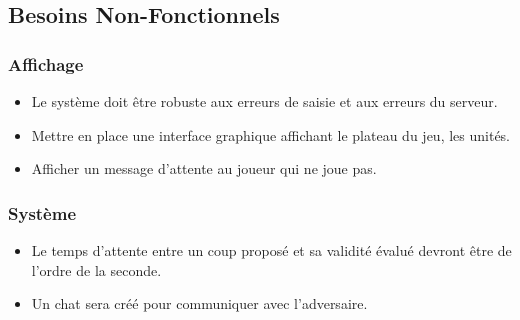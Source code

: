 \subsection{Besoins Non-Fonctionnels}

\subsubsection{Affichage}
\begin{itemize}
    \item Le système doit être robuste aux erreurs de saisie et aux erreurs du serveur.
    \item Mettre en place une interface graphique affichant le plateau du jeu, les unités.
    \item Afficher un message d'attente au joueur qui ne joue pas.
\end{itemize}

\subsubsection{Système}
\begin{itemize}
    \item Le temps d'attente entre un coup proposé et sa validité évalué devront être de l'ordre de la seconde.
    \item Un chat sera créé pour communiquer avec l'adversaire.
\end{itemize}